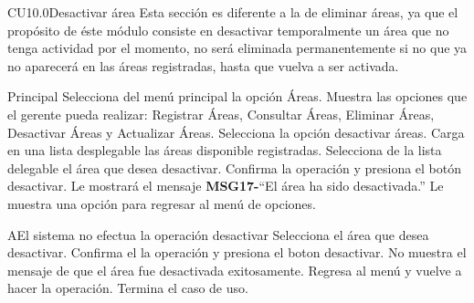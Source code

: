

	\begin{UseCase}{CU10.0}{Desactivar área}{
		Esta sección es diferente a la de eliminar áreas, ya que el propósito de éste módulo consiste en desactivar temporalmente un área que no tenga actividad por el momento, no será eliminada permanentemente si no que ya no aparecerá en las áreas registradas, hasta que vuelva a ser activada.
	}
	\end{UseCase}

\begin{UCtrayectoria}{Principal}
		\UCpaso[\UCactor] Selecciona del menú principal la opción Áreas.
		\UCpaso Muestra las opciones que el gerente pueda realizar: Registrar Áreas, Consultar Áreas, Eliminar Áreas, Desactivar Áreas y Actualizar Áreas.
		\UCpaso[\UCactor] Selecciona la opción desactivar áreas.
		\UCpaso Carga en una lista desplegable las áreas disponible registradas.
		\UCpaso[\UCactor] Selecciona de la lista delegable el área que desea desactivar.
		\UCpaso[\UCactor] Confirma la operación y presiona el botón desactivar.
		\UCpaso Le mostrará el mensaje {\bf MSG17-}``El área ha sido desactivada.''
		\UCpaso Le muestra una opción para regresar al menú de opciones.
	\end{UCtrayectoria}

\begin{UCtrayectoriaA}{A}{El sistema no efectua la operación desactivar}
			\UCpaso[\UCactor] Selecciona el área que desea desactivar.
			\UCpaso[\UCactor] Confirma el la operación y presiona el boton desactivar.
			\UCpaso No muestra el mensaje de que el área fue desactivada exitosamente.
			\UCpaso[\UCactor] Regresa al menú y vuelve a hacer la operación.
			\UCpaso[] Termina el caso de uso.
\end{UCtrayectoriaA}

